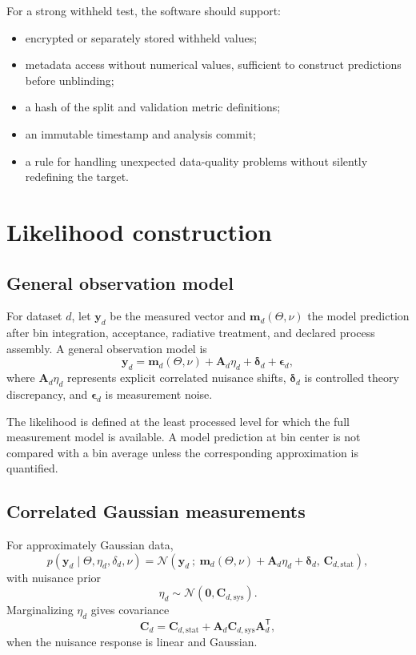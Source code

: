 \documentclass[11pt]{article}
\newcommand{\trans}{^{\mathsf T}}
\newcommand{\sys}{\mathrm{sys}}
\newcommand{\stat}{\mathrm{stat}}
\begin{document}
For a strong withheld test, the software should support:
\begin{itemize}
\item encrypted or separately stored withheld values;
\item metadata access without numerical values, sufficient to construct
      predictions before unblinding;
\item a hash of the split and validation metric definitions;
\item an immutable timestamp and analysis commit;
\item a rule for handling unexpected data-quality problems without silently
      redefining the target.
\end{itemize}

\section{Likelihood construction}
\label{sec:likelihood}

\subsection{General observation model}

For dataset \(d\), let \(\bm y_d\) be the measured vector and
\(\bm m_d(\Theta,\nu)\) the model prediction after bin integration, acceptance,
radiative treatment, and declared process assembly.  A general observation
model is
\begin{equation}
 \bm y_d
 =
 \bm m_d(\Theta,\nu)
 +
 \bm A_d\eta_d
 +
 \bm\delta_d
 +
 \bm\epsilon_d,
 \label{eq:observation-model}
\end{equation}
where \(\bm A_d\eta_d\) represents explicit correlated nuisance shifts,
\(\bm\delta_d\) is controlled theory discrepancy, and
\(\bm\epsilon_d\) is measurement noise.

The likelihood is defined at the least processed level for which the full
measurement model is available.  A model prediction at bin center is not
compared with a bin average unless the corresponding approximation is
quantified.

\subsection{Correlated Gaussian measurements}

For approximately Gaussian data,
\begin{equation}
 p(\bm y_d\mid\Theta,\eta_d,\delta_d,\nu)
 =
 \mathcal N\!\left(
 \bm y_d\ ;\
 \bm m_d(\Theta,\nu)+\bm A_d\eta_d+\bm\delta_d,\,
 \bm C_{d,\stat}
 \right),
 \label{eq:gaussian-likelihood}
\end{equation}
with nuisance prior
\begin{equation}
 \eta_d\sim\mathcal N(\bm 0,\bm C_{d,\sys}).
 \label{eq:nuisance-prior}
\end{equation}
Marginalizing \(\eta_d\) gives covariance
\begin{equation}
 \bm C_d
 =
 \bm C_{d,\stat}
 +
 \bm A_d\bm C_{d,\sys}\bm A_d\trans ,
 \label{eq:marginal-covariance}
\end{equation}
when the nuisance response is linear and Gaussian.
\end{document}
